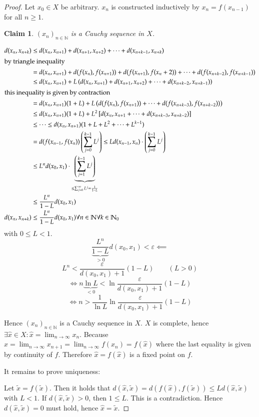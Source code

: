 \documentclass{article}
\newtheorem*{claim}{Claim}%
\begin{document}
\begin{proof}
  Let $x_0 \in X$ be arbitrary.
  $x_n$ is constructed inductively by $x_n = f(x_{n-1})$ for all $n \geq 1$.

  \begin{claim}
    $(x_n)_{n \in \mathbb N}$ is a Cauchy sequence in $X$.
  \end{claim}

  \begin{align*}
    d(x_n, x_{n+k}) &\leq d(x_n, x_{n+1}) + d(x_{n+1}, x_{n+2}) + \dots + d(x_{n+k-1}, x_{n+k}) \\
  \intertext{by triangle inequality}
      &= d(x_n, x_{n+1}) + d(f(x_n), f(x_{n+1})) + d(f(x_{n+1}), f(x_n + 2)) + \dots + d(f(x_{n+k-2}), f(x_{n+k-1})) \\
      &\leq d(x_n, x_{n+1}) + L\left(d(x_n, x_{n+1}) + d(x_{n+1}, x_{n+2}) + \dots + d(x_{n+k-2}, x_{n+k-1})\right) \\
  \intertext{this inequality is given by contraction}
      &= d(x_n, x_{n+1}) (1 + L) + L \left(d(f(x_n), f(x_{n+1})) + \dots + d(f(x_{n+k-3}), f(x_{n+k-2}))\right) \\
      &\leq d(x_n, x_{n+1}) (1 + L) + L^2 \left[d(x_n, x_{n+1} + \dots + d(x_{n + k - 3}, x_{n+k-2})\right] \\
      &\leq \dots \leq d(x_n, x_{n+1}) (1 + L + L^2 + \dots + L^{k-1}) \\
      &= d(f(x_{n-1}, f(x_n)) \left(\sum_{j=0}^{k-1} L^j\right) \leq L d(x_{n-1}, x_n) \cdot \left(\sum_{j=0}^{k-1} L^j\right) \\
      &\leq L^n d(x_0, x_1) \cdot \underbrace{\left(\sum_{j=1}^{k-1} L^j\right)}_{\leq \sum_{j=0}^\infty L^j = \frac{1}{1 - L}} \\
      &\leq \frac{L^n}{1 - L} d(x_0, x_1) \\
    d(x_n, x_{n+k}) &\leq \frac{L^n}{1 - L} d(x_0, x_1) \forall n \in \mathbb N \forall k \in \mathbb N_0
  \end{align*}
  with $0 \leq L < 1$.
  \[ \frac{L^n}{\underbrace{1 - L}_{> 0}} d(x_0, x_1) < \varepsilon \impliedby \]
  \[ L^n < \frac{\varepsilon}{d(x_0, x_1) + 1} (1 - L) \qquad (L > 0) \]
  \[ \iff n \underbrace{\ln{L}}_{<0} < \ln \frac{\varepsilon}{d(x_0, x_1) + 1} (1 - L) \]
  \[ \iff n > \frac{1}{\ln{L}} \ln \frac{\varepsilon}{d(x_0, x_1) + 1} (1 - L) \]

  Hence $(x_n)_{n \in \mathbb N}$ is a Cauchy sequence in $X$. $X$ is complete, hence $\exists \hat{x} \in X: \hat{x} = \lim_{n \to \infty} x_n$.
  Because $\hat{x} = \lim_{n\to\infty} x_{n+1} = \lim_{n\to\infty} f(x_n) = f(\hat{x})$ where the last equality is given by continuity of $f$.
  Therefore $\hat{x} = f(\hat{x})$ is a fixed point on $f$.

  It remains to prove uniqueness:

  Let $\tilde{x} = f(\tilde{x})$. Then it holds that $d(\hat{x}, \tilde{x}) = d(f(\hat{x}), f(\tilde{x})) \leq L d(\hat{x}, \tilde{x})$ with $L < 1$.
  If $d(\hat{x}, \tilde{x}) > 0$, then $1 \leq L$. This is a contradiction.
  Hence $d(\hat{x}, \tilde{x}) = 0$ must hold, hence $\hat{x} = \tilde{x}$.
\end{proof}
\end{document}
